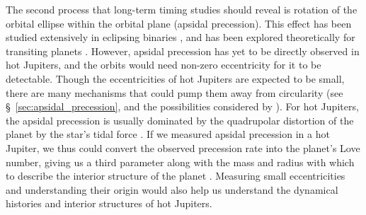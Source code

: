 \documentclass[12pt,twocolumn,tighten]{aastex62}
\begin{document}
The second process that long-term timing studies should reveal is
rotation of the orbital ellipse within the orbital plane (apsidal
precession).  This effect has been studied extensively in eclipsing
binaries \citep[{\it e.g.},][]{russell_notes_1939,
schwarzschild_structure_1958}, and has been explored theoretically for
transiting planets
\citep{heyl_using_2007,pal_periastron_2008,jordan_observability_2008,ragozzine_probing_2009}.
However, apsidal precession has yet to be directly observed in hot
Jupiters, and the orbits would need non-zero eccentricity for it to be
detectable.  Though the eccentricities of hot Jupiters are expected to
be small, there are many mechanisms that could pump them away from
circularity (see \S~\ref{sec:apsidal_precession}, and the
possibilities considered by \citealt{bailey_understanding_2019}).  For
hot Jupiters, the apsidal precession is usually dominated by the
quadrupolar distortion of the planet by the star's tidal force
\citep{ragozzine_probing_2009}.  If we measured apsidal precession in
a hot Jupiter, we thus could convert the observed precession rate into
the planet's Love number, giving us a third parameter along with the
mass and radius with which to describe the interior structure of the
planet \citep[{\it e.g.},][who performed a similar procedure for
HAT-P-13b]{batygin_determination_2009}.  Measuring small
eccentricities and understanding their origin would also help us
understand the dynamical histories and interior structures of hot
Jupiters.  \citep[{\it
e.g.},][respectively]{dawson_origins_2018,ibgui_tidal_2010}

\end{document}

